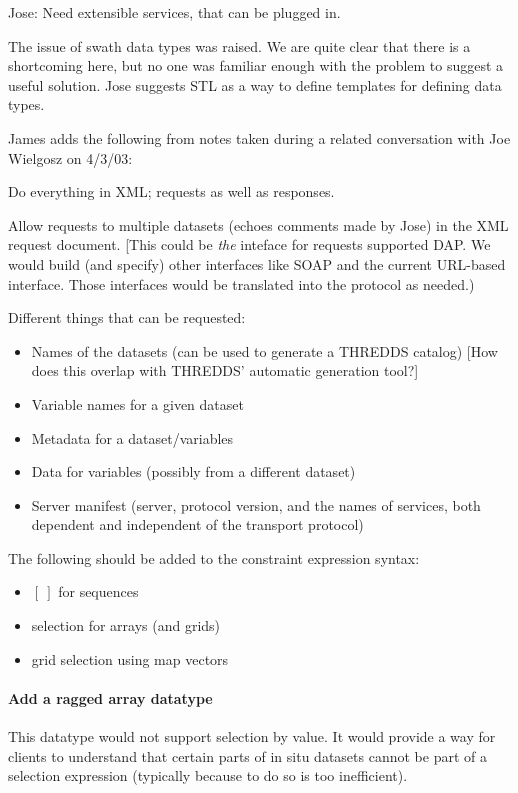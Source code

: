 Jose: Need extensible services, that can be plugged in.

The issue of swath data types was raised.  We are quite clear that
there is a shortcoming here, but no one was familiar enough with the
problem to suggest a useful solution.  Jose suggests \ac{STL} as a way
to define templates for defining data types.

James adds the following from notes taken during a related
conversation with Joe Wielgosz on 4/3/03:

Do everything in XML; requests as well as responses.

Allow requests to multiple datasets (echoes comments made by Jose) in the XML
request document. [This could be \emph{the} inteface for requests supported DAP.
We would build (and specify) other interfaces like SOAP and the current
URL-based interface. Those interfaces would be translated into the protocol
as needed.)

Different things that can be requested:

\begin{itemize}
\item Names of the datasets (can be used to generate a THREDDS
  catalog) [How does this overlap with THREDDS' automatic generation
  tool?] 

\item Variable names for a given dataset

\item Metadata for a dataset/variables

\item Data for variables (possibly from a different dataset)

\item Server manifest (server, protocol version, and the names of services, both
  dependent and independent of the transport protocol)

\end{itemize}

The following should be added to the constraint expression syntax:

\begin{itemize}
\item $[\ ]$ for sequences
\item selection for arrays (and grids)
\item grid selection using map vectors
\end{itemize}

\paragraph{Add a ragged array datatype}  This datatype would not support selection by
value. It would provide a way for clients to understand that certain
parts of in situ datasets cannot be part of a selection expression
(typically because to do so is too inefficient).

